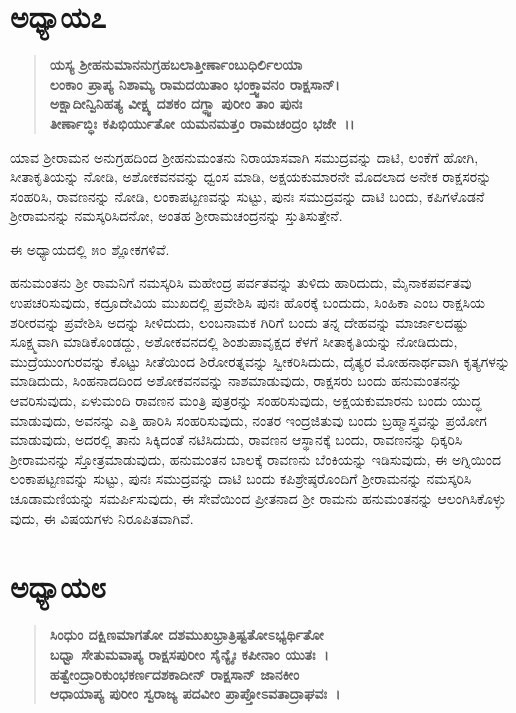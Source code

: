 \section*{ಅಧ್ಯಾಯ\enginline{-}೭}

\begin{verse}
\textbf{ಯಸ್ಯ ಶ‍್ರೀಹನುಮಾನನುಗ್ರಹಬಲಾತ್ತೀರ್ಣಾಂಬುಧಿರ್ಲಿಲಯಾ }\\\textbf{ಲಂಕಾಂ ಪ್ರಾಪ್ಯ ನಿಶಾಮ್ಯ ರಾಮದಯಿತಾಂ ಭಂಕ್ತ್ವಾವನಂ ರಾಕ್ಷಸಾನ್।} \\\textbf{ಅಕ್ಷಾದೀನ್ವಿನಿಹತ್ಯ ವೀಕ್ಷ್ಯ ದಶಕಂ ದಗ್ಧ್ವಾ ಪುರೀಂ ತಾಂ ಪುನಃ}\\\textbf{ತೀರ್ಣಾಬ್ಧಿಃ ಕಪಿಭಿರ್ಯುತೋ ಯಮನಮತ್ತಂ ರಾಮಚಂದ್ರಂ ಭಜೇ~।।}
\end{verse}

ಯಾವ ಶ‍್ರೀರಾಮನ ಅನುಗ್ರಹದಿಂದ ಶ‍್ರೀಹನುಮಂತನು ನಿರಾಯಾಸವಾಗಿ ಸಮುದ್ರವನ್ನು ದಾಟಿ, ಲಂಕೆಗೆ ಹೋಗಿ, ಸೀತಾಕೃತಿಯನ್ನು ನೋಡಿ, ಅಶೋಕವನವನ್ನು ಧ್ವಂಸ ಮಾಡಿ, ಅಕ್ಷಯಕುಮಾರನೇ ಮೊದಲಾದ ಅನೇಕ ರಾಕ್ಷಸರನ್ನು ಸಂಹರಿಸಿ, ರಾವಣನನ್ನು ನೋಡಿ, ಲಂಕಾಪಟ್ಟಣವನ್ನು ಸುಟ್ಟು, ಪುನಃ ಸಮುದ್ರವನ್ನು ದಾಟಿ ಬಂದು, ಕಪಿಗಳೊಡನೆ ಶ‍್ರೀರಾಮನನ್ನು ನಮಸ್ಕರಿಸಿದನೋ, ಅಂತಹ ಶ‍್ರೀರಾಮಚಂದ್ರನನ್ನು ಸ್ತುತಿಸುತ್ತೇನೆ.

ಈ ಅಧ್ಯಾಯದಲ್ಲಿ ೫೦ ಶ್ಲೋಕಗಳಿವೆ.

ಹನುಮಂತನು ಶ‍್ರೀ ರಾಮನಿಗೆ ನಮಸ್ಕರಿಸಿ ಮಹೇಂದ್ರ ಪರ್ವತವನ್ನು ತುಳಿದು ಹಾರಿದುದು, ಮೈನಾಕಪರ್ವತವು ಉಪಚರಿಸುವುದು, ಕದ್ರೂದೇವಿಯ ಮುಖದಲ್ಲಿ ಪ್ರವೇಶಿಸಿ ಪುನಃ ಹೊರಕ್ಕೆ ಬಂದುದು, ಸಿಂಹಿಕಾ ಎಂಬ ರಾಕ್ಷಸಿಯ ಶರೀರವನ್ನು ಪ್ರವೇಶಿಸಿ ಅದನ್ನು ಸೀಳಿದುದು, ಲಂಬನಾಮಕ ಗಿರಿಗೆ ಬಂದು ತನ್ನ ದೇಹವನ್ನು ಮಾರ್ಜಾಲದಷ್ಟು ಸೂಕ್ಷ್ಮವಾಗಿ ಮಾಡಿಕೊಂಡದ್ದು, ಅಶೋಕವನದಲ್ಲಿ ಶಿಂಶುಪಾವೃಕ್ಷದ ಕೆಳಗೆ ಸೀತಾಕೃತಿಯನ್ನು ನೋಡಿದುದು, ಮುದ್ರೆಯುಂಗುರವನ್ನು ಕೊಟ್ಟು ಸೀತೆಯಿಂದ ಶಿರೋರತ್ನವನ್ನು ಸ್ವೀಕರಿಸಿದುದು, ದೈತ್ಯರ ಮೋಹನಾರ್ಥವಾಗಿ ಕೃತ್ಯಗಳನ್ನು ಮಾಡಿದುದು, ಸಿಂಹನಾದದಿಂದ ಅಶೋಕವನವನ್ನು ನಾಶಮಾಡುವುದು, ರಾಕ್ಷಸರು ಬಂದು ಹನುಮಂತನನ್ನು ಆವರಿಸುವುದು, ಏಳುಮಂದಿ ರಾವಣನ ಮಂತ್ರಿ ಪುತ್ರರನ್ನು ಸಂಹರಿಸುವುದು, ಅಕ್ಷಯಕುಮಾರನು ಬಂದು ಯುದ್ಧ ಮಾಡುವುದು, ಅವನನ್ನು ಎತ್ತಿ ಹಾರಿಸಿ ಸಂಹರಿಸುವುದು, ನಂತರ ಇಂದ್ರಜಿತುವು ಬಂದು ಬ್ರಹ್ಮಾಸ್ತ್ರವನ್ನು ಪ್ರಯೋಗ ಮಾಡುವುದು, ಅದರಲ್ಲಿ ತಾನು ಸಿಕ್ಕಿದಂತೆ ನಟಿಸಿದುದು, ರಾವಣನ ಆಸ್ಥಾನಕ್ಕೆ ಬಂದು, ರಾವಣನನ್ನು ಧಿಕ್ಕರಿಸಿ ಶ‍್ರೀರಾಮನನ್ನು ಸ್ತೋತ್ರಮಾಡುವುದು, ಹನುಮಂತನ ಬಾಲಕ್ಕೆ ರಾವಣನು ಬೆಂಕಿಯನ್ನು ಇಡಿಸುವುದು, ಈ ಅಗ್ನಿಯಿಂದ ಲಂಕಾಪಟ್ಟಣವನ್ನು ಸುಟ್ಟು, ಪುನಃ ಸಮುದ್ರವನ್ನು ದಾಟಿ ಬಂದು ಕಪಿಶ್ರೇಷ್ಠರೊಂದಿಗೆ ಶ‍್ರೀರಾಮನನ್ನು ನಮಸ್ಕರಿಸಿ ಚೂಡಾಮಣಿಯನ್ನು ಸಮರ್ಪಿಸುವುದು, ಈ ಸೇವೆಯಿಂದ ಪ್ರೀತನಾದ ಶ‍್ರೀ ರಾಮನು ಹನುಮಂತನನ್ನು ಆಲಂಗಿಸಿಕೊಳ್ಳು ವುದು, ಈ ವಿಷಯಗಳು ನಿರೂಪಿತವಾಗಿವೆ.


\section*{ಅಧ್ಯಾಯ\enginline{-}೮}

\begin{verse}
\textbf{ಸಿಂಧುಂ ದಕ್ಷಿಣಮಾಗತೋ ದಶಮುಖಭ್ರಾತ್ರಿಷ್ಟತೋಽಭ್ಯರ್ಥಿತೋ} \\\textbf{ಬಧ್ವಾ ಸೇತುಮವಾಪ್ಯ ರಾಕ್ಷಸಪುರೀಂ ಸೈನ್ಯೈಃ ಕಪೀನಾಂ ಯುತಃ~। }\\\textbf{ಹತ್ವೇಂದ್ರಾರಿಕುಂಭಕರ್ಣದಶಕಾದೀನ್ ರಾಕ್ಷಸಾನ್ ಜಾನಕೀಂ }\\\textbf{ಆಧಾಯಾಪ್ಯ ಪುರೀಂ ಸ್ವರಾಜ್ಯ ಪದವೀಂ ಪ್ರಾಪ್ತೋಽವತಾದ್ರಾಘವಃ~।}
\end{verse}

